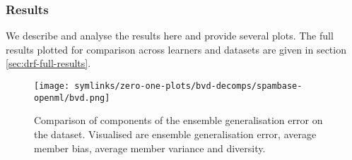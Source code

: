 \documentclass[../main.tex]{subfiles}
\begin{document}





\pagebreak
\pagebreak



\subsubsection{Results}


We describe and analyse the results here and provide several plots. The full results plotted for comparison across learners and datasets are given in section \ref{sec:drf-full-results}.

\begin{figure*}
    \texttt{[image: symlinks/zero-one-plots/bvd-decomps/spambase-openml/bvd.png]}
    \caption{
        Comparison of components of the ensemble generalisation error on the \spambase dataset. Visualised are ensemble generalisation error, average member bias, average member variance and diversity.
    }
    \label{fig:spambase-bvd}
\end{figure*}




\end{document}

